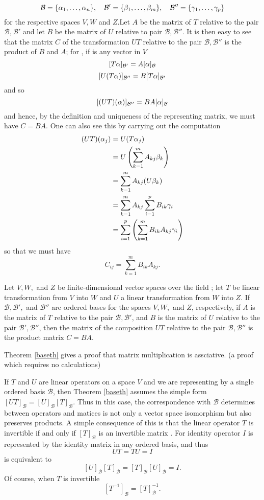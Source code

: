 \documentclass{mynotes}
\begin{document}
$$\mathcal{B}=\{\alpha_1,\ldots,\alpha_n\},\quad\mathcal{B'}=\{\beta_1,\ldots,\beta_m\},\quad\mathcal{B''}=\{\gamma_1,\ldots,\gamma_p\}$$for the respective spaces $V,W$ and $Z$.Let $A$ be the matrix of $T$ relative to the pair $\mathcal{B},\mathcal{B'}$ and let $B$ be the matrix of $U$ relative to pair $\mathcal{B},\mathcal{B''}$. It is then easy to see that the matrix $C$ of the transformation $UT$ relative to the pair $\mathcal{B},\mathcal{B''}$ is the product of $B$ and $A$; for , if \al is any vector in $V$ $$[T\alpha]_{\mathcal{B'}} = A[\alpha]_{\mathcal{B}}$$$$[U(T\alpha)]_{\mathcal{B''}}=B[T\alpha]_{\mathcal{B'}}$$and so $$[(UT)(\alpha)]_{\mathcal{B''}}=BA[\alpha]_{\mathcal{B}}$$and hence, by the definition and uniqueness of the representing matrix, we must have $C=BA$. One can also see this by carrying out the computation \begin{align*} (UT)(\alpha_j)&=U(T\alpha_j)\\&=U\left(\sum_{k=1}^mA_{kj}\beta_k\right)\\&=\sum_{k=1}^mA_{kj}(U\beta_k)\\&=\sum_{k=1}^mA_{kj}\sum_{i=1}^pB_{ik}\gamma_i\\&=\sum_{i=1}^p\left(\sum_{k=1}^mB_{ik}A_{kj}\gamma_i\right)\end{align*} so that we must have $$C_{ij} =\sum_{k=1}^mB_{ik}A_{kj}.$$
\begin{theorem}\label{baseth}
Let $V,W,$ and $Z$ be finite-dimensional vector spaces over the field \F; let $T$ be linear transformation from $V$ into $W$ and $U$ a linear transformation from $W$ into $Z$. If $\mathcal{B},\mathcal{B'},$ and $\mathcal{B''}$ are ordered bases for the spaces $V,W,$ and $Z$, respectively, if $A$ is the matrix of $T$ relative to the pair $\mathcal{B},\mathcal{B'}$, and $B$ is the matrix of $U$ relative to the pair $\mathcal{B'},\mathcal{B''}$, then the matrix of the composition $UT$ relative to the pair $\mathcal{B},\mathcal{B''}$ is the product matrix $C=BA$.
\end{theorem}
\begin{remark}
Theorem \ref{baseth} gives a proof that matrix multiplication is assciative. (a proof which requires no calculations)
\end{remark}
\begin{remark}
If $T$ and $U$ are linear operators on a space $V$ and we are representing by a single ordered basis $\mathcal{B}$, then Theorem \ref{baseth} assumes the simple form $[UT]_{\mathcal{B}}=[U]_{\mathcal{B}}[T]_{\mathcal{B}}$. Thus in this case, the correspondence with $\mathcal{B}$ determines between operators and matices is not only a vector space isomorphism but also preserves products. A simple consequence of this is that the linear operator $T$ is invertible if and only if $[T]_{\mathcal{B}}$ is an invertible matrix . For identity operator $I$ is represented by the identity matrix in any  ordered basis, and thus $$UT=TU = I$$ is equivalent to $$[U]_{\mathcal{B}}[T]_{\mathcal{B}}=[T]_{\mathcal{B}}[U]_{\mathcal{B}}=I.$$Of course, when $T$ is invertible $$[T^{-1}]_{\mathcal{B}} = [T]_{\mathcal{B}}^{-1}.$$
\end{remark}
\end{document}
